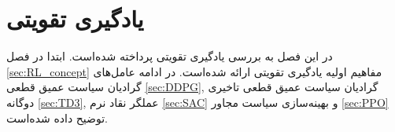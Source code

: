 \chapter{یادگیری تقویتی}\label{ch:rl}
در این فصل به بررسی یادگیری تقویتی پرداخته شده‌است. ابتدا در فصل
\ref{sec:RL_concept}
مفاهیم اولیه یادگیری تقویتی ارائه شده‌است. در ادامه عامل‌های گرادیان سیاست عمیق قطعی
\ref{sec:DDPG},
گرادیان سیاست عمیق قطعی تاخیری دوگانه
\ref{sec:TD3},
عملگر نقاد نرم
\ref{sec:SAC}
و
بهینه‌سازی سیاست مجاور
\ref{sec:PPO}
توضیح داده شده‌است.




